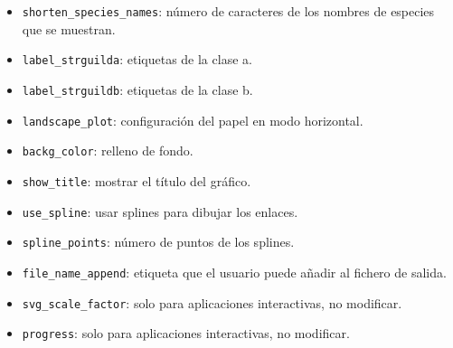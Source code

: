 \begin{itemize}
\item \texttt{shorten\_species\_names}: número de caracteres de los nombres de especies que se muestran.

\item \texttt{label\_strguilda}: etiquetas de la clase a.

\item \texttt{label\_strguildb}: etiquetas de la clase b.

\item \texttt{landscape\_plot}: configuración del papel en modo horizontal.

\item \texttt{backg\_color}: relleno de fondo.

\item \texttt{show\_title}: mostrar el título del gráfico.

\item \texttt{use\_spline}: usar splines para dibujar los enlaces.

\item \texttt{spline\_points}: número de puntos de los splines.

\item \texttt{file\_name\_append}: etiqueta que el usuario puede añadir al fichero de salida.

\item \texttt{svg\_scale\_factor}: solo para aplicaciones interactivas, no modificar.

\item \texttt{progress}: solo para aplicaciones interactivas, no modificar.
\end{itemize}
